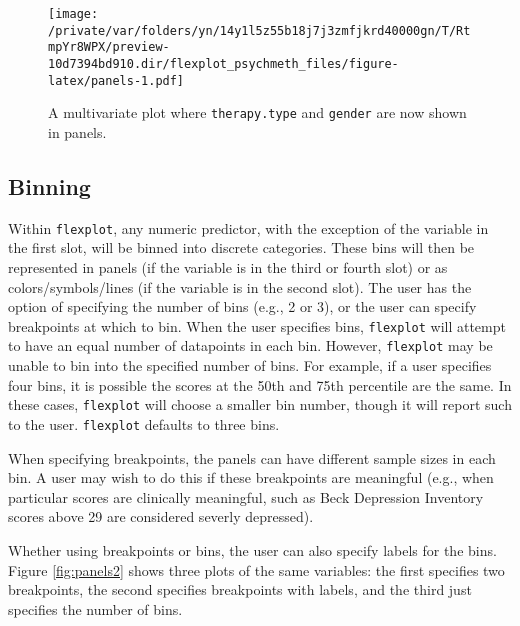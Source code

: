 \documentclass[
  english,
  man]{apa6}
\begin{document}
\begin{figure}
\centering
\texttt{[image: /private/var/folders/yn/14y1l5z55b18j7j3zmfjkrd40000gn/T/RtmpYr8WPX/preview-10d7394bd910.dir/flexplot\_psychmeth\_files/figure-latex/panels-1.pdf]}
\caption{\label{fig:panels}A multivariate plot where \texttt{therapy.type} and \texttt{gender} are now shown in panels. \label{fig:panels}}
\end{figure}

\normalsize

\hypertarget{binning}{%
\subsection{Binning}\label{binning}}

Within \texttt{flexplot}, any numeric predictor, with the exception of the variable in the first slot, will be binned into discrete categories. These bins will then be represented in panels (if the variable is in the third or fourth slot) or as colors/symbols/lines (if the variable is in the second slot). The user has the option of specifying the number of bins (e.g., 2 or 3), or the user can specify breakpoints at which to bin. When the user specifies bins, \texttt{flexplot} will attempt to have an equal number of datapoints in each bin. However, \texttt{flexplot} may be unable to bin into the specified number of bins. For example, if a user specifies four bins, it is possible the scores at the 50th and 75th percentile are the same. In these cases, \texttt{flexplot} will choose a smaller bin number, though it will report such to the user. \texttt{flexplot} defaults to three bins.

When specifying breakpoints, the panels can have different sample sizes in each bin. A user may wish to do this if these breakpoints are meaningful (e.g., when particular scores are clinically meaningful, such as Beck Depression Inventory scores above 29 are considered severly depressed).

Whether using breakpoints or bins, the user can also specify labels for the bins. Figure \ref{fig:panels2} shows three plots of the same variables: the first specifies two breakpoints, the second specifies breakpoints with labels, and the third just specifies the number of bins.

\small
\end{document}
